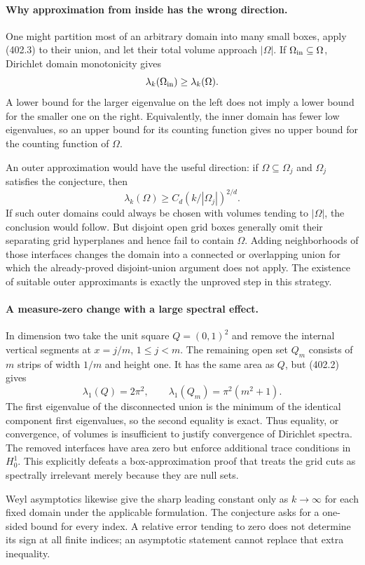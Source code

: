 \documentclass[11pt]{article}
\begin{document}
\paragraph{Why approximation from inside has the wrong direction.}
One might partition most of an arbitrary domain into many small boxes, apply (402.3) to their union, and let their total volume approach $|\Omega|$. If $\Omega_{\rm in}\subseteq\Omega$, Dirichlet domain monotonicity gives
\[
 \lambda_k(\Omega_{\rm in})\ge\lambda_k(\Omega).
\]
A lower bound for the larger eigenvalue on the left does not imply a lower bound for the smaller one on the right. Equivalently, the inner domain has fewer low eigenvalues, so an upper bound for its counting function gives no upper bound for the counting function of $\Omega$.

An outer approximation would have the useful direction: if $\Omega\subseteq\Omega_j$ and $\Omega_j$ satisfies the conjecture, then
\[
 \lambda_k(\Omega)\ge C_d(k/|\Omega_j|)^{2/d}.
\]
If such outer domains could always be chosen with volumes tending to $|\Omega|$, the conclusion would follow. But disjoint open grid boxes generally omit their separating grid hyperplanes and hence fail to contain $\Omega$. Adding neighborhoods of those interfaces changes the domain into a connected or overlapping union for which the already-proved disjoint-union argument does not apply. The existence of suitable outer approximants is exactly the unproved step in this strategy.

\paragraph{A measure-zero change with a large spectral effect.}
In dimension two take the unit square $Q=(0,1)^2$ and remove the internal vertical segments at $x=j/m$, $1\le j<m$. The remaining open set $Q_m$ consists of $m$ strips of width $1/m$ and height one. It has the same area as $Q$, but (402.2) gives
\[
 \lambda_1(Q)=2\pi^2,\qquad
 \lambda_1(Q_m)=\pi^2(m^2+1). \tag{402.7}
\]
The first eigenvalue of the disconnected union is the minimum of the identical component first eigenvalues, so the second equality is exact. Thus equality, or convergence, of volumes is insufficient to justify convergence of Dirichlet spectra. The removed interfaces have area zero but enforce additional trace conditions in $H_0^1$. This explicitly defeats a box-approximation proof that treats the grid cuts as spectrally irrelevant merely because they are null sets.

Weyl asymptotics likewise give the sharp leading constant only as $k\to\infty$ for each fixed domain under the applicable formulation. The conjecture asks for a one-sided bound for every index. A relative error tending to zero does not determine its sign at all finite indices; an asymptotic statement cannot replace that extra inequality.
\end{document}
